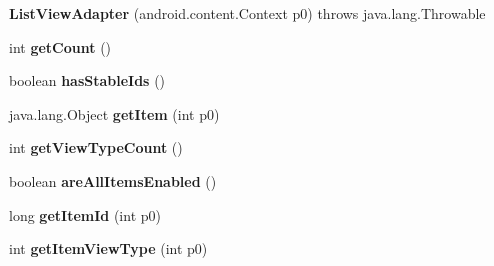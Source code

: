 \begin{DoxyCompactItemize}
\item 
\mbox{\label{classmd5b60ffeb829f638581ab2bb9b1a7f4f3f_1_1_list_view_adapter_a05870e24bde7dafbf3a32f91e03545d9}} 
{\bfseries List\+View\+Adapter} (android.\+content.\+Context p0)  throws java.\+lang.\+Throwable 	
\item 
\mbox{\label{classmd5b60ffeb829f638581ab2bb9b1a7f4f3f_1_1_list_view_adapter_a9f24848499759eacb32669883ca93995}} 
int {\bfseries get\+Count} ()
\item 
\mbox{\label{classmd5b60ffeb829f638581ab2bb9b1a7f4f3f_1_1_list_view_adapter_af602626fd68dbd7b7b5f21f077d0a303}} 
boolean {\bfseries has\+Stable\+Ids} ()
\item 
\mbox{\label{classmd5b60ffeb829f638581ab2bb9b1a7f4f3f_1_1_list_view_adapter_a73d2d62a8f9f049e63781a1a8f96b232}} 
java.\+lang.\+Object {\bfseries get\+Item} (int p0)
\item 
\mbox{\label{classmd5b60ffeb829f638581ab2bb9b1a7f4f3f_1_1_list_view_adapter_ad3f6189cd42d626e244ac54ad5afdc10}} 
int {\bfseries get\+View\+Type\+Count} ()
\item 
\mbox{\label{classmd5b60ffeb829f638581ab2bb9b1a7f4f3f_1_1_list_view_adapter_a2c591a49427e11f184e70d0db0678c5d}} 
boolean {\bfseries are\+All\+Items\+Enabled} ()
\item 
\mbox{\label{classmd5b60ffeb829f638581ab2bb9b1a7f4f3f_1_1_list_view_adapter_a9bf248f34b601de71eb45468af4d5230}} 
long {\bfseries get\+Item\+Id} (int p0)
\item 
\mbox{\label{classmd5b60ffeb829f638581ab2bb9b1a7f4f3f_1_1_list_view_adapter_ac49d0d79db395817151bc8bb649e6a4f}} 
int {\bfseries get\+Item\+View\+Type} (int p0)

\end{DoxyCompactItemize}
